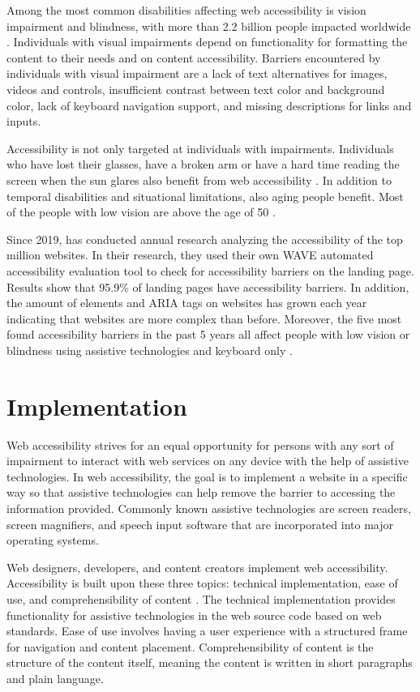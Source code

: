 Among the most common disabilities affecting web accessibility is vision impairment and blindness, with more than 2.2 billion people impacted worldwide \citep[Chapter~1]{webaccessibility, whovision}. Individuals with visual impairments depend on functionality for formatting the content to their needs and on content accessibility. Barriers encountered by individuals with visual impairment are a lack of text alternatives for images, videos and controls, insufficient contrast between text color and background color, lack of keyboard navigation support, and missing descriptions for links and inputs. 

Accessibility is not only targeted at individuals with impairments. Individuals who have lost their glasses, have a broken arm or have a hard time reading the screen when the sun glares also benefit from web accessibility \citep{w3cbarriers}. In addition to temporal disabilities and situational limitations, also aging people benefit. Most of the people with low vision are above the age of 50 \citep{whovision}.

Since 2019, \textcite{webaimmillions} has conducted annual research analyzing the accessibility of the top million websites. In their research, they used their own WAVE automated accessibility evaluation tool to check for accessibility barriers on the landing page. Results show that 95.9\% of landing pages have accessibility barriers. In addition, the amount of elements and ARIA tags on websites has grown each year indicating that websites are more complex than before. Moreover, the five most found accessibility barriers in the past 5 years all affect people with low vision or blindness using assistive technologies and keyboard only \citep{webaimmillions}. 

\section{Implementation}

Web accessibility strives for an equal opportunity for persons with any sort of impairment to interact with web services on any device with the help of assistive technologies. In web accessibility, the goal is to implement a website in a specific way so that assistive technologies can help remove the barrier to accessing the information provided. Commonly known assistive technologies are screen readers, screen magnifiers, and speech input software that are incorporated into major operating systems.

Web designers, developers, and content creators implement web accessibility. Accessibility is built upon these three topics: technical implementation, ease of use, and comprehensibility of content \citep{webaccessibilitydefinition}. The technical implementation provides functionality for assistive technologies in the web source code based on web standards. Ease of use involves having a user experience with a structured frame for navigation and content placement. Comprehensibility of content is the structure of the content itself, meaning the content is written in short paragraphs and plain language. 

